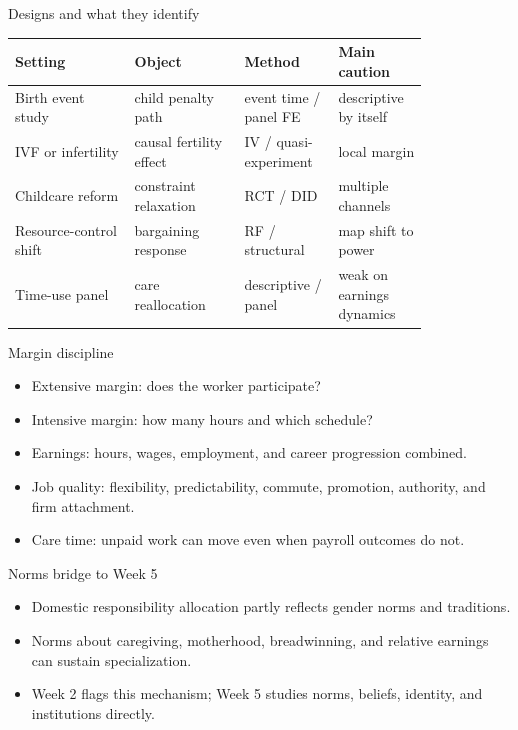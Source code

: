 \documentclass[aspectratio=169,11pt]{beamer}
\begin{document}
\begin{frame}{Designs and what they identify}
\scriptsize
\setlength{\tabcolsep}{3pt}
\begin{tabular}{p{0.25\linewidth} p{0.23\linewidth} p{0.18\linewidth} p{0.16\linewidth}}
\toprule
Setting & Object & Method & Main caution \\
\midrule
Birth event study & child penalty path & event time / panel FE & descriptive by itself \\
IVF or infertility & causal fertility effect & IV / quasi-experiment & local margin \\
Childcare reform & constraint relaxation & RCT / DID & multiple channels \\
Resource-control shift & bargaining response & RF / structural & map shift to power \\
Time-use panel & care reallocation & descriptive / panel & weak on earnings dynamics \\
\bottomrule
\end{tabular}
\end{frame}

\begin{frame}{Margin discipline}
\begin{itemize}
    \item Extensive margin: does the worker participate?
    \item Intensive margin: how many hours and which schedule?
    \item Earnings: hours, wages, employment, and career progression combined.
    \item Job quality: flexibility, predictability, commute, promotion, authority, and firm attachment.
    \item Care time: unpaid work can move even when payroll outcomes do not.
\end{itemize}
\end{frame}

\begin{frame}{Norms bridge to Week 5}
\begin{itemize}
    \item Domestic responsibility allocation partly reflects gender norms and traditions.
    \item Norms about caregiving, motherhood, breadwinning, and relative earnings can sustain specialization.
    \item Week 2 flags this mechanism; Week 5 studies norms, beliefs, identity, and institutions directly.
\end{itemize}
\end{frame}
\end{document}
